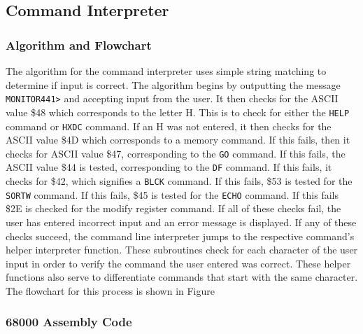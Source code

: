 \documentclass[12pt]{article}
\begin{document}
		\subsection{Command Interpreter}
			\subsubsection{Algorithm and Flowchart}
			The algorithm for the command interpreter uses simple string matching to determine if input is correct. The algorithm begins by outputting the message \texttt{MONITOR441>} and accepting input from the user. It then checks for the ASCII value \$48 which corresponds to the letter H. This is to check for either the \texttt{HELP} command or \texttt{HXDC} command. If an H was not entered, it then checks for the ASCII value \$4D which corresponds to a memory command. If this fails, then it checks for ASCII value \$47, corresponding to the \texttt{GO} command. If this fails, the ASCII value \$44 is tested, corresponding to the \texttt{DF} command. If this fails, it checks for \$42, which signifies a \texttt{BLCK} command. If this fails, \$53 is tested for the \texttt{SORTW} command. If this fails, \$45 is tested for the \texttt{ECHO} command. If this fails \$2E is checked for the modify register command. If all of these checks fail, the user has entered incorrect input and an error message is displayed. If any of these checks succeed, the command line interpreter jumps to the respective command's helper interpreter function. These subroutines check for each character of the user input in order to verify the command the user entered was correct. These helper functions also serve to differentiate commands that start with the same character. The flowchart for this process is shown in Figure 
			\subsubsection{68000 Assembly Code}
\end{document}
